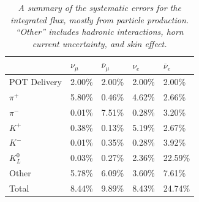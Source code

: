 \begin{table}
\centering
\begin{tabular}{ |p{3cm}|p{1.2cm}|p{1.2cm}|p{1.2cm}|p{1.2cm}|   }

 \hline
  & $\nu_\mu$ & $\overline{\nu}_\mu$ & $\nu_e$ & $\overline{\nu}_e$ \\
 \hline 
 POT Delivery & 2.00\% & 2.00\% & 2.00\% & 2.00\% \\
 $\pi^+$ & 5.80\% & 0.46\% & 4.62\% & 2.66\% \\
 $\pi^-$ & 0.01\% & 7.51\% & 0.28\% & 3.20\% \\
 $K^+$ & 0.38\% & 0.13\% & 5.19\% & 2.67\% \\
 $K^-$ & 0.01\% & 0.35\% & 0.28\% & 3.92\% \\
 $K^0_L$ & 0.03\% & 0.27\% & 2.36\% & 22.59\% \\
 Other & 5.78\% & 6.09\% & 3.60\% & 7.61\% \\\hline
 Total & 8.44\% & 9.89\% & 8.43\% & 24.74\% \\\hline
 \hline
\end{tabular}
\caption{\textit{A summary of the systematic errors for the integrated flux, mostly from particle production. ``Other'' includes hadronic interactions, horn current uncertainty, and skin effect.}}\label{UB_flux_sys_table}
\end{table}
